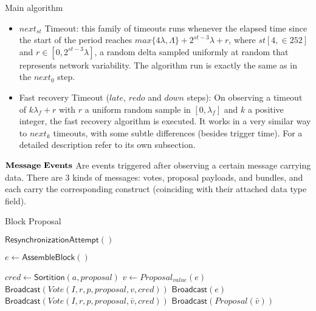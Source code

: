 \documentclass[10pt,a4paper]{article}
\begin{document}
\begin{section}{Main algorithm}
\begin{itemize}
    \item $next_{st}$ Timeout: this family of timeouts runs whenever the elapsed time since the start of the period reaches
    $max\{4\lambda, \Lambda \} + 2^{st-3}\lambda + r$, where $st [4, \in 252]$ and $r \in [0, 2^{st-3}\lambda]$, a random 
    delta sampled uniformly at random that represents network variability.
    The algorithm run is exactly the same as in the $next_0$ step.

    \item Fast recovery Timeout ($late$, $redo$ and $down$ steps): On observing a timeout of $k\lambda_f + r$ with $r$ a uniform random sample in $[0, \lambda_f]$ and
    $k$ a positive integer, the fast recovery algorithm is executed. It works in a very similar way to $next_k$ timeouts, with some subtle differences (besides trigger time).
    For a detailed description refer to its own subsection.
\end{itemize}


$\bold{Message \ Events}$ Are events triggered after observing a certain message carrying data.
There are 3 kinds of messages: votes, proposal payloads, and bundles, and each carry
the corresponding construct (coinciding with their attached data type field).
\\

\begin{subsection}{Block Proposal}\label{ssect:blockproposal}

    \begin{algorithm}
        \begin{algorithmic}[1]

            \State $\mathsf{ResynchronizationAttempt}()$

            \State $e \gets \mathsf{AssembleBlock}()$

                \State $cred \gets 
                \mathsf{Sortition}(a, proposal)$
                        \State $v \gets Proposal_{value}(e)$
                        \State $\mathsf{Broadcast}(Vote(I, r, p, proposal, v, cred))$
                        \State $\mathsf{Broadcast}(e)$
                    \Else
                        \State $\mathsf{Broadcast}(Vote(I, r, p, proposal, \bar{v}, cred))$
                            \State $\mathsf{Broadcast}(Proposal(\bar{v}))$
                        \EndIf
                    \EndIf
                \EndIf
            \EndFor
        \EndFunction
        \end{algorithmic}
        \caption{\underline{Block proposal}}
    \end{algorithm}


\end{subsection}
\end{section}
\end{document}
